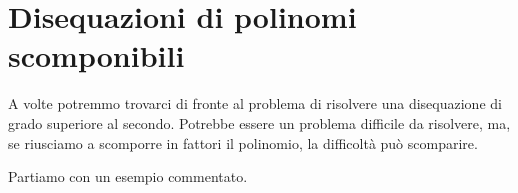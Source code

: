 %  
% 
% 

\section{Disequazioni di polinomi scomponibili}
\label{sec:diseq_scomposizione}

A volte potremmo trovarci di fronte al problema di risolvere una
disequazione di grado superiore al secondo.
Potrebbe essere un problema difficile da risolvere, ma, se riusciamo a
scomporre in fattori il polinomio, la difficoltà può scomparire.

Partiamo con un esempio commentato.

